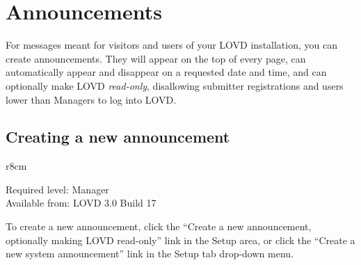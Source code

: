 \pagebreak[4] %
\hypertarget{sec:announcements}{}
\section{Announcements}
\label{sec:announcements}
For messages meant for visitors and users of your LOVD installation, you can create announcements.
They will appear on the top of every page, can automatically appear and disappear on a requested date and time,
 and can optionally make LOVD \emph{read-only}, disallowing submitter registrations and users lower than Managers
 to log into LOVD.



\subsection{Creating a new announcement}
\label{ssec:announcements_create}
\begin{wrapfigure}[3]{r}{8cm} %
  \vspace{-25pt}
  \begin{leftbar}
    Required level: Manager\\
    Available from: LOVD 3.0 Build 17
  \end{leftbar}
\end{wrapfigure}
To create a new announcement, click the ``Create a new announcement, optionally making LOVD read-only'' link in the
 Setup area, or click the ``Create a new system announcement'' link in the Setup tab drop-down menu.

